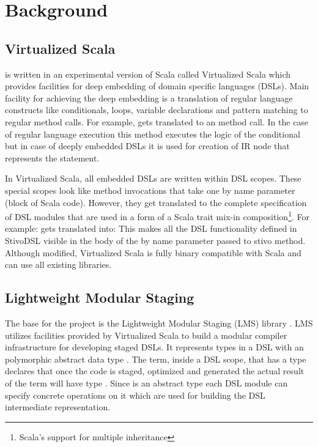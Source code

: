 \section{Background}
\label{sec:background}

\subsection{Virtualized Scala}
\label{subsec:virtualized-scala}
\tool is written in an experimental version of Scala called Virtualized Scala \cite{moors_scala-virtualized_2012} which provides facilities for deep embedding of domain specific languages (DSLs). Main facility for achieving the deep embedding is a translation of regular language constructs like conditionals, loops, variable declarations and pattern matching to regular method calls. For example,  gets translated to an  method call. In the case of regular language execution this method executes the logic of the conditional but in case of deeply embedded DSLs it is used for creation of IR node that represents the  statement.  

In Virtualized Scala, all embedded DSLs are written within DSL scopes. These special scopes look like method invocations that take one by name parameter (block of Scala code). However, they get translated to the complete specification of DSL modules that are used in a form of a Scala trait mix-in composition\footnote[1]{Scala's support for multiple inheritance}. For example: 
 gets translated into:
This makes all the DSL functionality defined in StivoDSL visible in the body of the by name parameter passed to stivo method. 
Although modified, Virtualized Scala is fully binary compatible with Scala and can use all existing libraries.  


\subsection{Lightweight Modular Staging}
\label{subsec:lightweight-modular-staging}

The base for the \tool project is the Lightweight Modular Staging (LMS) library \cite{rompf_lightweight_2010}. LMS utilizes facilities provided by Virtualized Scala to build a modular compiler infrastructure for developing staged DSLs. It represents types in a DSL with an polymorphic abstract data type . The term, inside a DSL scope, that has a type  declares that once the code is staged, optimized and generated the actual result of the term will have type .  Since  is an abstract type each DSL module can specify concrete operations on it which are used for building the DSL intermediate representation. 

